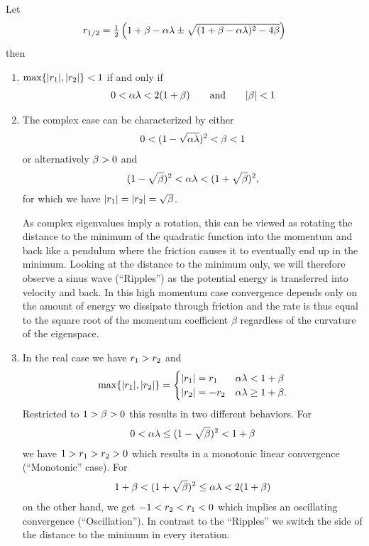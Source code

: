 \begin{theorem}
	\label{thm: momentum - stable set of parameters}
	Let
	\begin{align*}
		r_{1/2}
		= \tfrac12 \left(
			1+\beta-\alpha\lambda \pm \sqrt{(1+\beta-\alpha\lambda)^2 - 4\beta}
		\right)
	\end{align*}
	then 
	\begin{enumerate}
		\item \(\max\{|r_1|,|r_2|\}<1\) if and only if
		\begin{align*}
			0<\alpha\lambda < 2(1+\beta) \qquad \text{and} \qquad |\beta|<1
		\end{align*}
		\item The complex case can be characterized by either
		\begin{align*}
			0<(1-\sqrt{\alpha\lambda})^2 < \beta < 1
		\end{align*}		
		or alternatively \(\beta>0\) and
		\begin{align*}
			(1-\sqrt{\beta})^2 < \alpha\lambda < (1+\sqrt{\beta})^2,
		\end{align*}
		for which we have \(|r_1|=|r_2|=\sqrt{\beta}\).
		
		As complex
		eigenvalues imply a rotation, this can be viewed as rotating the distance
		to the minimum of the quadratic function into the momentum and back like 
		a pendulum where the friction causes it to eventually end up in the
		minimum. Looking at the distance to the minimum only, we will therefore
		observe a sinus wave (``Ripples'') as the potential energy is transferred
		into velocity and back. In this high momentum case convergence depends
		only on the amount of energy we dissipate through friction and the rate is
		thus equal to the square root of the momentum coefficient \(\beta\)
		regardless of the curvature of the eigenspace.
		\item In the real case we have \(r_1>r_2\) and
		\begin{align}
			\max\{|r_1|, |r_2|\} = \begin{cases}
				|r_1|=r_1 & \alpha\lambda < 1+\beta \\
				|r_2|=-r_2 & \alpha\lambda \ge 1+\beta.
			\end{cases}
		\end{align}
		Restricted to \(1>\beta>0\) this results in two different	
		behaviors. For
		\begin{align*}
			0<\alpha\lambda \le (1-\sqrt{\beta})^2 < 1+\beta
		\end{align*}
		we have \(1>r_1 > r_2 > 0\) which results in a monotonic
		linear convergence (``Monotonic'' case). For
		\begin{align*}
			1+\beta < (1+\sqrt{\beta})^2\le \alpha\lambda < 2(1+\beta)
		\end{align*}
		on the other hand, we get \(-1 < r_2 < r_1 < 0\) which implies 
		an oscillating convergence (``Oscillation''). In contrast to the ``Ripples''
		we switch the side of the distance to the minimum in every iteration.
	\end{enumerate}
\end{theorem}
